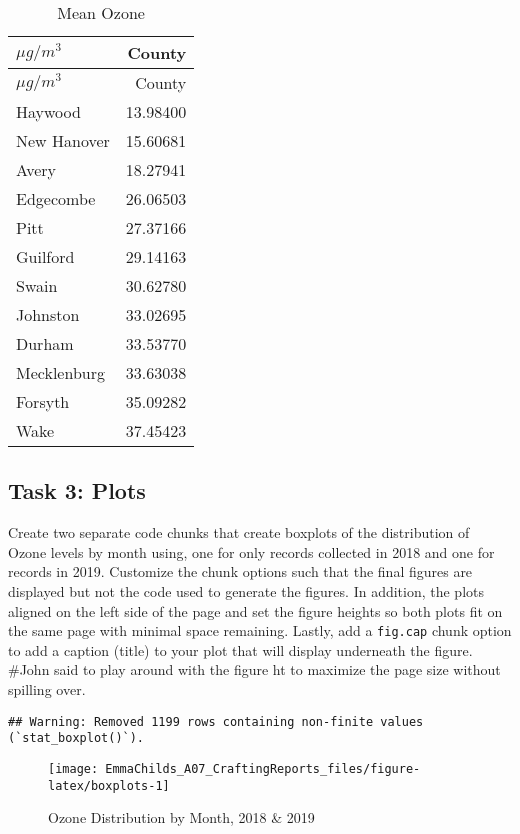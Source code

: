 \documentclass[
]{article}
\begin{document}
\begin{longtable}[]{@{}lr@{}}
\caption{Mean Ozone}\tabularnewline
\toprule()
\(\mu g/m^3\) & County \\
\midrule()
\endfirsthead
\toprule()
\(\mu g/m^3\) & County \\
\midrule()
\endhead
Haywood & 13.98400 \\
New Hanover & 15.60681 \\
Avery & 18.27941 \\
Edgecombe & 26.06503 \\
Pitt & 27.37166 \\
Guilford & 29.14163 \\
Swain & 30.62780 \\
Johnston & 33.02695 \\
Durham & 33.53770 \\
Mecklenburg & 33.63038 \\
Forsyth & 35.09282 \\
Wake & 37.45423 \\
\bottomrule()
\end{longtable}

\newpage

\hypertarget{task-3-plots}{%
\subsection{Task 3: Plots}\label{task-3-plots}}

Create two separate code chunks that create boxplots of the distribution
of Ozone levels by month using, one for only records collected in 2018
and one for records in 2019. Customize the chunk options such that the
final figures are displayed but not the code used to generate the
figures. In addition, the plots aligned on the left side of the page and
set the figure heights so both plots fit on the same page with minimal
space remaining. Lastly, add a \texttt{fig.cap} chunk option to add a
caption (title) to your plot that will display underneath the figure.
\#John said to play around with the figure ht to maximize the page size
without spilling over.

\newpage

\begin{verbatim}
## Warning: Removed 1199 rows containing non-finite values (`stat_boxplot()`).
\end{verbatim}

\begin{figure}

\texttt{[image: EmmaChilds\_A07\_CraftingReports\_files/figure-latex/boxplots-1]} \hfill{}

\caption{Ozone Distribution by Month, 2018 & 2019}\label{fig:boxplots-1}
\end{figure}
\end{document}

